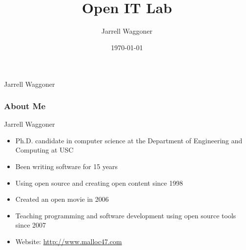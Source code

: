 \documentclass{beamer}
\title[Students]{Open IT Lab}
\author{Jarrell Waggoner}
\institute[Open IT Lab] {Open IT Lab\\
  \medskip
      {\emph{waggonej@email.sc.edu}} }
\date{\today}
\begin{document}
\rm

{
  \begin{frame}
    \vspace{18em}

    \begin{center}\large{\textcolor{beamer@mygrey}{Jarrell Waggoner}}\end{center}


  \end{frame}
}

\begin{frame}
  \frametitle{About Me}
  \begin{LARGE}
    Jarrell Waggoner
  \end{LARGE}
  \begin{Large}
    \begin{itemize}
    \item Ph.D. candidate in computer science at the Department of
      Engineering and Computing at USC
    \item Been writing software for 15 years
    \item Using open source and creating open content since 1998
    \item Created an open movie in 2006
    \item Teaching programming and software development using open source tools since 2007
    \item Website: \textcolor{beamer@myblue}{\href{http://www.malloc47.com}{http://www.malloc47.com}}
    \end{itemize}
  \end{Large}
\end{frame}
\end{document}
